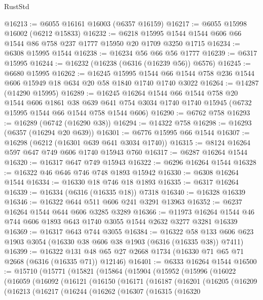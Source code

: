 \begin{lexlean}{RustStd}
\begin{coremodule}
@16213 := @6055 @16161 @16003 (@6357 @16159)
@16217 := @6055 @15998 @16002 (@6212 @15833)
@16232 := @6218 @15995 @1544 @1544 @606 @66 @1544 @86 @758 @237 @1777 @15950 @20 @1709 @3250 @1715
@16234 := @6308 @15995 @1544
@16238 := @16234 @56 @66 @56 @1777
@16239 := @6317 @15995
@16244 := @16232 (@16238 (@6316 (@16239 @56)) @6576)
@16245 := @6680 @15995
@16262 := @16245
    @15995
    @1544
    @66
    @1544
    @758
    @236
    @1544
    @606
    @15949
    @18
    @634
    @20
    @58
    @1840
    @1740
    @1740
    @3022
@16264 := @14287 (@14290 @15995)
@16289 := @16245
    @16264
    @1544
    @66
    @1544
    @758
    @20
    @1544
    @606
    @1861
    @38
    @639
    @641
    @754
    @3034
    @1740
    @1740
    @15945
    (@6732 @15995 @1544 @66 @1544 @758 @1544 @606)
@16290 := @6762 @758
@16293 := @16289 (@6742 (@16290 @38))
@16294 := @14322 @758
@16298 := @16293 (@6357 (@16294 @20 @639))
@16301 := @6776 @15995 @66 @1544
@16307 := @16298 (@6212 (@16301 @639 @641 @3034 @1740))
@16315 := @8124 @16264 @597 @647 @749 @606 @1740 @15943 @760
@16317 := @6287 @16264 @1544
@16320 := @16317 @647 @749 @15943
@16322 := @6296 @16264 @1544
@16328 := @16322 @46 @646 @746 @748 @1893 @15942
@16330 := @6308 @16264 @1544
@16334 := @16330 @18 @746 @18 @1893
@16335 := @6317 @16264
@16339 := @16334 (@6316 (@16335 @18)) @7318
@16340 := @16328 @16339
@16346 := @16322 @644 @511 @606 @241 @3291 @13963
@16352 := @6237 @16264 @1544 @644 @606 @3285 @3289
@16366 := @11973 @16264 @1544 @46 @744 @606 @1893 @643 @1740 @3055 @1544 @2632 @3277 @3281 @16339
@16369 := @16317 @643 @744 @3055
@16384 := @16322
    @58
    @133
    @606
    @623
    @1903
    @3054
    (@16330 @38 @606 @38 @1903 (@6316 (@16335 @38)) @7411)
@16399 := @16322 @131 @48 @65 @27 @2668 @1734 (@16330 @71 @65 @71 @2668 (@6316 (@16335 @71)) @12146)
@16401 := @6333 @16264 @1544
@16500 := @15710
    (@15771
      (@15821
        (@15864
          (@15904
            (@15952
              (@15996
                (@16022
                  (@16059
                    (@16092
                      (@16121
                        (@16150
                          (@16171
                            (@16187
                              (@16201
                                (@16205
                                  (@16209
                                    (@16213
                                      (@16217
                                        (@16244
                                          (@16262
                                            (@16307
                                              (@16315
                                                (@16320

\end{coremodule}
\end{lexlean}
